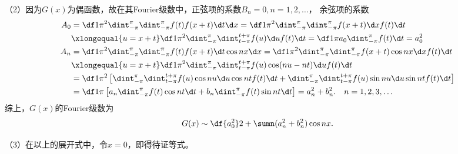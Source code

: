（2）因为$G(x)$为偶函数，故在其Fourier级数中，正弦项的系数$B_n=0,n=1,2,\ldots$，
余弦项的系数
\begin{align*}
	A_0&=\df1{\pi^2}\dint_{-\pi}^{\pi}\dint_{-\pi}^{\pi}
	f(t)f(x+t)\d t\d x
	=\df1{\pi^2}\dint_{-\pi}^{\pi}\dint_{-\pi}^{\pi}
	f(x+t)\d x f(t)\d t\\
	&\xlongequal{u=x+t}\df1{\pi^2}\dint_{-\pi}^{\pi}\dint_{t-\pi}^{t+\pi}
	f(u)\d u f(t)\d t
	=\df1{\pi}a_0\dint_{-\pi}^{\pi}f(t)\d t
	=a_0^2\\
	A_n&=\df1{\pi^2}\dint_{-\pi}^{\pi}\dint_{-\pi}^{\pi}
	f(t)f(x+t)\d t\cos nx\d x
	=\df1{\pi^2}\dint_{-\pi}^{\pi}\dint_{-\pi}^{\pi}
	f(x+t)\cos nx\d x f(t)\d t\\
	&\xlongequal{u=x+t}\df1{\pi^2}\dint_{-\pi}^{\pi}\dint_{t-\pi}^{t+\pi}
	f(u)\cos(nu-nt)\d u f(t)\d t\\
	&=\df1{\pi^2}\left[\dint_{-\pi}^{\pi}\dint_{t-\pi}^{t+\pi}
	f(u)\cos nu\d u\cos nt f(t)\d t
	+\dint_{-\pi}^{\pi}\dint_{t-\pi}^{t+\pi}
	f(u)\sin nu\d u\sin nt f(t)\d t\right]\\
	&=\df1{\pi}\left[a_n\dint_{-\pi}^{\pi}f(t)\cos nt\d t
	+b_n\dint_{-\pi}^{\pi}f(t)\sin nt\d t\right]
	=a_n^2+b_n^2.\quad n=1,2,3,\ldots
\end{align*}
综上，$G(x)$的Fourier级数为
$$G(x)\sim\df{a_0^2}2+\sumn(a_n^2+b_n^2)\cos nx.$$

（3）在以上的展开式中，令$x=0$，即得待证等式。\fin